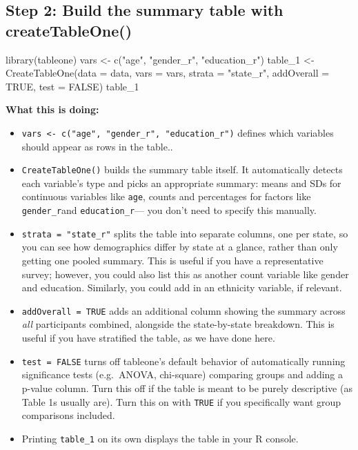 \documentclass[
  letterpaper,
  DIV=11,
  numbers=noendperiod]{scrreprt}
\newenvironment{Shaded}{\begin{snugshade}}{\end{snugshade}}
\newcommand{\AttributeTok}[1]{\textcolor[rgb]{0.40,0.45,0.13}{#1}}
\newcommand{\ConstantTok}[1]{\textcolor[rgb]{0.56,0.35,0.01}{#1}}
\newcommand{\FunctionTok}[1]{\textcolor[rgb]{0.28,0.35,0.67}{#1}}
\newcommand{\NormalTok}[1]{\textcolor[rgb]{0.00,0.23,0.31}{#1}}
\newcommand{\OtherTok}[1]{\textcolor[rgb]{0.00,0.23,0.31}{#1}}
\newcommand{\StringTok}[1]{\textcolor[rgb]{0.13,0.47,0.30}{#1}}
\begin{document}
\subsection{Step 2: Build the summary table with
createTableOne()}\label{step-2-build-the-summary-table-with-createtableone}

\begin{Shaded}
\begin{Highlighting}[]
\FunctionTok{library}\NormalTok{(tableone)  vars }\OtherTok{\textless{}{-}} \FunctionTok{c}\NormalTok{(}\StringTok{"age"}\NormalTok{, }\StringTok{"gender\_r"}\NormalTok{, }\StringTok{"education\_r"}\NormalTok{)  table\_1 }\OtherTok{\textless{}{-}} \FunctionTok{CreateTableOne}\NormalTok{(}\AttributeTok{data =}\NormalTok{ data,                             }\AttributeTok{vars =}\NormalTok{ vars,                             }\AttributeTok{strata =} \StringTok{"state\_r"}\NormalTok{,                            }\AttributeTok{addOverall =} \ConstantTok{TRUE}\NormalTok{,                            }\AttributeTok{test =} \ConstantTok{FALSE}\NormalTok{) table\_1}
\end{Highlighting}
\end{Shaded}

\textbf{What this is doing:}

\begin{itemize}
\item
  \texttt{vars\ \textless{}-\ c("age",\ "gender\_r",\ "education\_r")}
  defines which variables should appear as rows in the table..
\item
  \texttt{CreateTableOne()} builds the summary table itself. It
  automatically detects each variable's type and picks an appropriate
  summary: means and SDs for continuous variables like \texttt{age},
  counts and percentages for factors like \texttt{gender\_r}and
  \texttt{education\_r}--- you don't need to specify this manually.
\item
  \texttt{strata\ =\ "state\_r"} splits the table into separate columns,
  one per state, so you can see how demographics differ by state at a
  glance, rather than only getting one pooled summary. This is useful if
  you have a representative survey; however, you could also list this as
  another count variable like gender and education. Similarly, you could
  add in an ethnicity variable, if relevant.
\item
  \texttt{addOverall\ =\ TRUE} adds an additional column showing the
  summary across \emph{all} participants combined, alongside the
  state-by-state breakdown. This is useful if you have stratified the
  table, as we have done here.
\item
  \texttt{test\ =\ FALSE} turns off tableone's default behavior of
  automatically running significance tests (e.g.~ANOVA, chi-square)
  comparing groups and adding a p-value column. Turn this off if the
  table is meant to be purely descriptive (as Table 1s usually are).
  Turn this on with \texttt{TRUE} if you specifically want group
  comparisons included.
\item
  Printing \texttt{table\_1} on its own displays the table in your R
  console.
\end{itemize}
\end{document}
